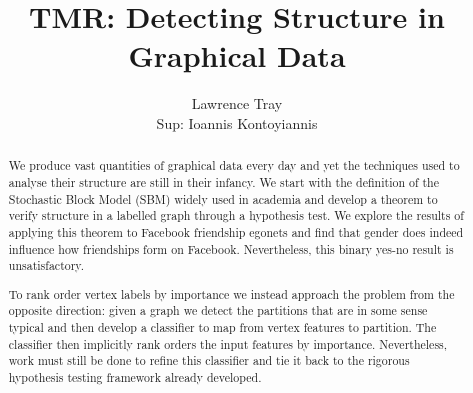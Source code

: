 \documentclass[]{article}
\title{TMR: Detecting Structure in Graphical Data}
\author{Lawrence Tray \\ Sup: Ioannis Kontoyiannis}
\begin{document}
\maketitle

\begin{abstract}
We produce vast quantities of graphical data every day and yet the techniques used to analyse their structure are still in their infancy. We start with the definition of the Stochastic Block Model (SBM) widely used in academia and develop a theorem to verify structure in a labelled graph through a hypothesis test. We explore the results of applying this theorem to Facebook friendship egonets and find that gender does indeed influence how friendships form on Facebook. Nevertheless, this binary yes-no result is unsatisfactory.

To rank order vertex labels by importance we instead approach the problem from the opposite direction: given a graph we detect the partitions that are in some sense typical and then develop a classifier to map from vertex features to partition. The classifier then implicitly rank orders the input features by importance. Nevertheless, work must still be done to refine this classifier and tie it back to the rigorous hypothesis testing framework already developed.
\end{abstract}
\end{document}
